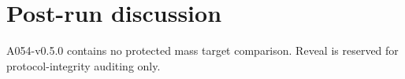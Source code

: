\section*{Post-run discussion}
A054-v0.5.0 contains no protected mass target comparison. Reveal is reserved for protocol-integrity auditing only.

